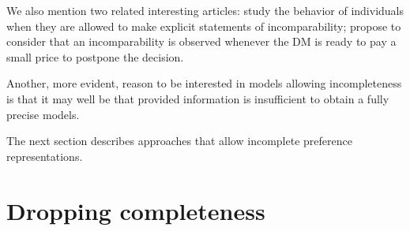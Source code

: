 \documentclass[french, english]{llncs}
\begin{document}
	
We also mention two related interesting articles: 
\citet{deparis_when_2012} study the behavior of individuals when they are allowed to make explicit statements of incomparability; \citet{danan_are_2006} propose to consider that an incomparability is observed whenever the \ac{DM} is ready to pay a small price to postpone the decision.

Another, more evident, reason to be interested in models allowing incompleteness is that it may well be that provided information is insufficient to obtain a fully precise models.
	
The next section describes approaches that allow incomplete preference representations.

\section{Dropping completeness}\label{sec:incomp}
\end{document}
